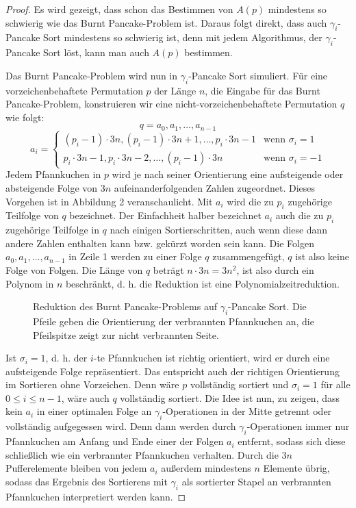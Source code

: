 \documentclass[a4paper, 10pt, ngerman]{article}
\begin{document}
\begin{proof}
    Es wird gezeigt, dass schon das Bestimmen von $A(p)$ mindestens so schwierig wie das Burnt Pancake-Problem ist. Daraus folgt direkt, dass auch $\gamma_i$-Pancake Sort mindestens so schwierig ist, denn mit jedem Algorithmus, der $\gamma_i$-Pancake Sort löst, kann man auch $A(p)$ bestimmen.

    Das Burnt Pancake-Problem wird nun in $\gamma_i$-Pancake Sort simuliert. Für eine vorzeichenbehaftete Permutation $p$ der Länge $n$, die Eingabe für das Burnt Pancake-Problem, konstruieren wir eine nicht-vorzeichenbehaftete Permutation $q$ wie folgt:
    $$
        q = a_0, a_1, \dots, a_{n-1}
    $$
    $$
        a_i  = \begin{cases}
            (p_i - 1) \cdot 3n, (p_i - 1) \cdot 3n + 1, \dots, p_i \cdot 3n - 1 
            & \text{wenn } \sigma_i = 1  \\
            p_i \cdot 3n - 1, p_i \cdot 3n - 2, \dots, (p_i - 1) \cdot 3n       
            & \text{wenn } \sigma_i = -1
        \end{cases}
    $$
    Jedem Pfannkuchen in $p$ wird je nach seiner Orientierung eine aufsteigende oder absteigende Folge von $3n$ aufeinanderfolgenden Zahlen zugeordnet. Dieses Vorgehen ist in Abbildung 2 veranschaulicht. Mit $a_i$ wird die zu $p_i$ zugehörige Teilfolge von $q$ bezeichnet. Der Einfachheit halber bezeichnet $a_i$ auch die zu $p_i$ zugehörige Teilfolge in $q$ nach einigen Sortierschritten, auch wenn diese dann andere Zahlen enthalten kann bzw. gekürzt worden sein kann. Die Folgen $a_0, a_1, \dots, a_{n-1}$ in Zeile 1 werden zu einer Folge $q$ zusammengefügt, $q$ ist also keine Folge von Folgen. Die Länge von $q$ beträgt $n \cdot 3n = 3n^2$, ist also durch ein Polynom in $n$ beschränkt, d. h. die Reduktion ist eine Polynomialzeitreduktion.

    \begin{figure}[h]
        \centering
        \caption{Reduktion des Burnt Pancake-Problems auf $\gamma_i$-Pancake Sort. Die Pfeile geben die Orientierung der verbrannten Pfannkuchen an, die Pfeilspitze zeigt zur nicht verbrannten Seite.}
    \end{figure}
    Ist $\sigma_i = 1$, d. h. der $i$-te Pfannkuchen ist richtig orientiert, wird er durch eine aufsteigende Folge repräsentiert. Das entspricht auch der richtigen Orientierung im Sortieren ohne Vorzeichen. Denn wäre $p$ vollständig sortiert und $\sigma_i = 1$ für alle $0 \le i \le n - 1$, wäre auch $q$ vollständig sortiert. Die Idee ist nun, zu zeigen, dass kein $a_i$ in einer optimalen Folge an $\gamma_i$-Operationen in der Mitte getrennt oder vollständig aufgegessen wird. Denn dann werden durch $\gamma_i$-Operationen immer nur Pfannkuchen am Anfang und Ende einer der Folgen $a_i$ entfernt, sodass sich diese schließlich wie ein verbrannter Pfannkuchen verhalten. Durch die $3n$ Pufferelemente bleiben von jedem $a_i$ außerdem mindestens $n$ Elemente übrig, sodass das Ergebnis des Sortierens mit $\gamma_i$ als sortierter Stapel an verbrannten Pfannkuchen interpretiert werden kann.


\end{proof}
\end{document}
